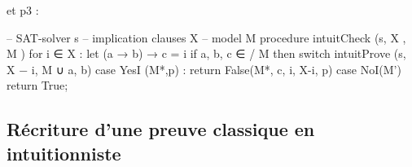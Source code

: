 et p3 :
\begin{prooftree}
\end{prooftree}



-- SAT-solver s
-- implication clauses X
-- model M
procedure intuitCheck (s, X , M )
for i ∈ X :
let (a → b) → c = i
if a, b, c ∈
/ M then
switch intuitProve (s, X − {i}, M ∪ {a}, b)
case YesI (M*,p) :
return False(M*, c, i, X-{i}, p)
case NoI(M')
return True;
\subsection{R\'ecriture d'une preuve classique en intuitionniste}

